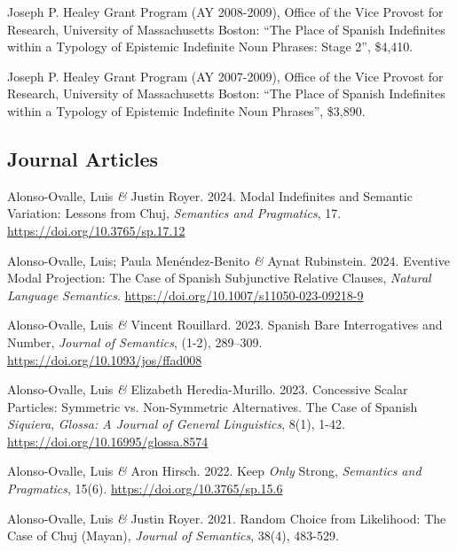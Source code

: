 \documentclass[11pt]{article}
\begin{document}
Joseph P. Healey Grant Program (AY 2008-2009), Office of the
  Vice Provost for Research, University of Massachusetts Boston: ``The
  Place of Spanish Indefinites within a Typology of Epistemic
  Indefinite Noun Phrases: Stage 2'', \$4,410.

Joseph P. Healey Grant Program (AY 2007-2009), Office of the Vice Provost for Research, University of Massachusetts Boston: ``The Place of Spanish Indefinites within a Typology of Epistemic Indefinite Noun Phrases'', \$3,890.


\subsection*{Journal Articles}

Alonso-Ovalle, Luis \textit{\&} Justin Royer. 2024. Modal Indefinites and Semantic Variation: Lessons from Chuj, \textit{Semantics and Pragmatics}, 17. \href{https://doi.org/10.3765/sp.17.12}{https://doi.org/10.3765/sp.17.12}


Alonso-Ovalle, Luis; Paula Men\'endez-Benito \textit{\&} Aynat Rubinstein. 2024. Eventive Modal Projection: The Case of Spanish Subjunctive Relative Clauses, \textit{Natural Language Semantics}. \href{https://doi.org/10.1007/s11050-023-09218-9}{https://doi.org/10.1007/s11050-023-09218-9}


Alonso-Ovalle, Luis \textit{\&} Vincent Rouillard. 2023. Spanish Bare Interrogatives and Number, \textit{Journal of Semantics}, (1-2), 289--309. \href{https://doi.org/10.1093/jos/ffad008}{https://doi.org/10.1093/jos/ffad008}


Alonso-Ovalle, Luis \textit{\&} Elizabeth Heredia-Murillo. 2023. Concessive Scalar Particles:
Symmetric vs. Non-Symmetric Alternatives.
The Case of Spanish \textit{Siquiera}, \textit{Glossa: A Journal of General Linguistics}, 8(1), 1-42. \href{https://doi.org/10.16995/glossa.8574}{https://doi.org/10.16995/glossa.8574}

 
Alonso-Ovalle, Luis \textit{\&} Aron Hirsch. 2022. Keep \textit{Only} Strong,  \textit{Semantics and Pragmatics}, 15(6). \href{https://doi.org/10.3765/sp.15.6}{https://doi.org/10.3765/sp.15.6}

Alonso-Ovalle, Luis \textit{\&} Justin Royer. 2021. Random Choice from Likelihood: The Case of Chuj (Mayan), \textit{Journal of Semantics}, 38(4), 483-529. 
\end{document}
